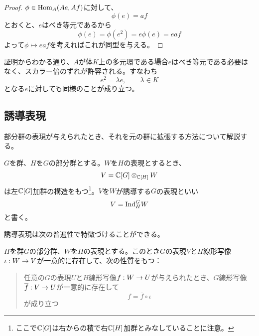 \documentclass{ltjsreport}
\begin{document}
\begin{proof}
  $\phi\in\text{Hom}_A(Ae,Af)$に対して、
  \[
  \phi(e)=af  
  \]
  とおくと、$e$はべき等元であるから
  \[
  \phi(e)=\phi(e^2)=e\phi(e)=eaf  
  \]
  よって$\phi\mapsto eaf$を考えればこれが同型を与える。
\end{proof}

\begin{notice}
  証明からわかる通り、$A$が体$K$上の多元環である場合$e$はべき等元である必要はなく、スカラー倍のずれが許容される。すなわち
  \[
  e^2=\lambda e,\qquad \lambda\in K
  \]
  となる$e$に対しても同様のことが成り立つ。
\end{notice}




\subsection{誘導表現}

部分群の表現が与えられたとき、それを元の群に拡張する方法について解説する。

\begin{defin}\label{ind_rep}
  $G$を群、$H$を$G$の部分群とする。$W$を$H$の表現とするとき、
  \[
  V=\mathbb{C}[G]\otimes_{\mathbb{C}[H]}W 
  \]
  は左$\mathbb{C}[G]$加群の構造をもつ\footnote{
    ここで$\mathbb{C}[G]$は右からの積で右$\mathbb{C}[H]$加群とみなしていることに注意。}。$V$を$W$が誘導する$G$の表現といい
  \[
  V=\text{Ind}_H^GW  
  \]
  と書く。
\end{defin}

誘導表現は次の普遍性で特徴づけることができる。

\begin{theo}[誘導表現の普遍性]\label{univ_ind_rep}
  $H$を群$G$の部分群、$W$を$H$の表現とする。このとき$G$の表現$V$と$H$線形写像$\iota:W\rightarrow V$が一意的に存在して、次の性質をもつ：
  \begin{quote}
    任意の$G$の表現$U$と$H$線形写像$f:W\rightarrow U$が与えられたとき、$G$線形写像$\overline{f}:V\rightarrow U$が一意的に存在して
    \[
    f=\overline{f}\circ\iota  
    \]
    が成り立つ
  \end{quote}
\end{theo}
\end{document}
